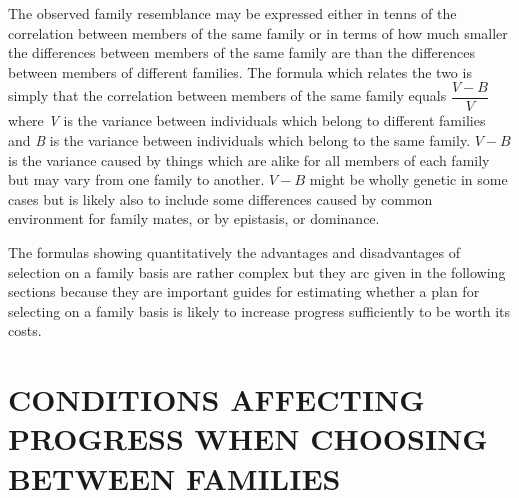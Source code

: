 The observed family resemblance may be expressed either in tenns
of the correlation between members of the same family or in terms of
how much smaller the differences between members of the same family
are than the differences between members of different families. The
formula which relates the two is simply that the correlation between
members of the same family equals $\dfrac{V - B}{V}$ where \textit{V}
is the variance between individuals which belong to different families
and \textit{B} is the variance between individuals which belong to the
same family. $V - B$ is the variance caused by things which are alike
for all members of each family but may vary from one family to another.
$V - B$ might be wholly genetic in some cases but is likely also to
include some differences caused by common environment for family mates,
or by epistasis, or dominance.

The formulas showing quantitatively the advantages and disadvantages
of selection on a family basis are rather complex but they arc given
in the following sections because they are important guides for
estimating whether a plan for selecting on a family basis is likely to
increase progress sufficiently to be worth its costs.

\section*{CONDITIONS AFFECTING PROGRESS WHEN CHOOSING BETWEEN FAMILIES}

